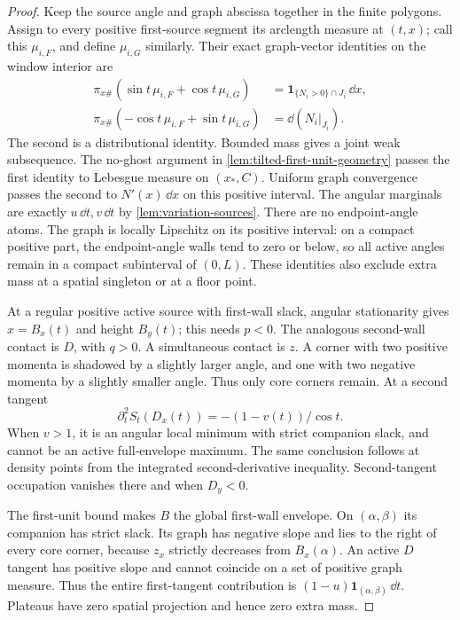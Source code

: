 \begin{proof}
Keep the source angle and graph abscissa together in the finite
polygons. Assign to every positive first-source segment its
arclength measure at $(t,x)$; call this $\mu_{i,F}$, and
define $\mu_{i,G}$ similarly. Their exact graph-vector identities
on the window interior are
\begin{align*}
 \pi_{x\#}(\sin t\,\mu_{i,F}+\cos t\,\mu_{i,G})
   &=\mathbf1_{\{N_i>0\}\cap J_i}\,\dd x,\\
 \pi_{x\#}(-\cos t\,\mu_{i,F}+\sin t\,\mu_{i,G})
   &=\dd(N_i|_{J_i}).
\end{align*}
The second is a distributional identity. Bounded mass gives a
joint weak subsequence. The no-ghost argument in
\cref{lem:tilted-first-unit-geometry} passes the first identity
to Lebesgue measure on $(x_*,C)$. Uniform graph convergence
passes the second to $N'(x)\,\dd x$ on this positive interval.
The angular marginals are exactly $u\,\dd t,v\,\dd t$ by
\cref{lem:variation-sources}. There are no endpoint-angle atoms.
The graph is locally Lipschitz on its positive interval:
on a compact positive part, the endpoint-angle walls tend to
zero or below, so all active angles remain in a compact
subinterval of $(0,L)$. These identities also exclude extra
mass at a spatial singleton or at a floor point.

At a regular positive active source with first-wall slack,
angular stationarity gives $x=B_x(t)$ and height $B_y(t)$;
this needs $p<0$. The analogous second-wall contact is $D$,
with $q>0$. A simultaneous contact is $z$.
A corner with two positive momenta is shadowed by a slightly
larger angle, and one with two negative momenta by a slightly
smaller angle. Thus only core corners remain.
At a second tangent
\[
 \partial_t^2 S_t(D_x(t))=-(1-v(t))/\cos t.
\]
When $v>1$, it is an angular local minimum with strict companion
slack, and cannot be an active full-envelope maximum. The same
conclusion follows at density points from the integrated
second-derivative inequality. Second-tangent occupation vanishes
there and when $D_y<0$.

The first-unit bound makes $B$ the global first-wall envelope.
On $(\alpha,\beta)$ its companion has strict slack. Its graph
has negative slope and lies to the right of every core corner,
because $z_x$ strictly decreases from $B_x(\alpha)$.
An active $D$ tangent has positive slope and cannot coincide on
a set of positive graph measure. Thus the entire first-tangent
contribution is $(1-u)\mathbf1_{(\alpha,\beta)}\,\dd t$.
Plateaus have zero spatial projection and hence zero extra mass.


\end{proof}
